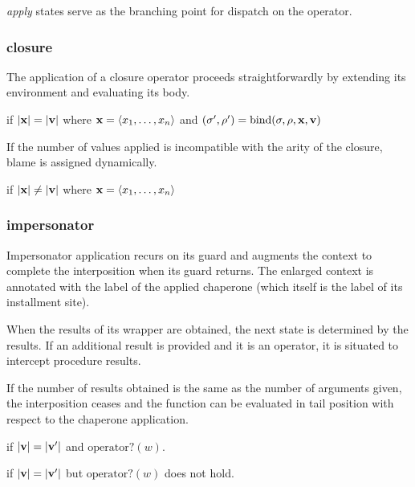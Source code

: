 \documentclass{sigplanconf}
\begin{document}
\emph{apply} states serve as the branching point for dispatch on the operator.

\subsubsection{closure}

The application of a closure operator proceeds straightforwardly by extending its environment and evaluating its body.

if $|\mathbf{x}|=|\mathbf{v}|$ where $\mathbf{x}=\langle x_1,\dots,x_n\rangle$ and $(\sigma',\rho')=\mathrm{bind}(\sigma,\rho,\mathbf{x},\mathbf{v})$

If the number of values applied is incompatible with the arity of the closure, blame is assigned dynamically.

if $|\mathbf{x}|\ne|\mathbf{v}|$ where $\mathbf{x}=\langle x_1,\dots,x_n\rangle$

\subsubsection{impersonator}

Impersonator application recurs on its guard and augments the context to complete the interposition when its guard returns.
The enlarged context is annotated with the label of the applied chaperone (which itself is the label of its installment site).


When the results of its wrapper are obtained, the next state is determined by the results.
If an additional result is provided and it is an operator, it is situated to intercept procedure results.

If the number of results obtained is the same as the number of arguments given, the interposition ceases and the function can be evaluated in tail position with respect to the chaperone application.


if $|\mathbf{v}|=|\mathbf{v'}|$ and $\mathrm{operator?}(w)$.

if $|\mathbf{v}|=|\mathbf{v'}|$ but $\mathrm{operator?}(w)$ does not hold.
\end{document}

